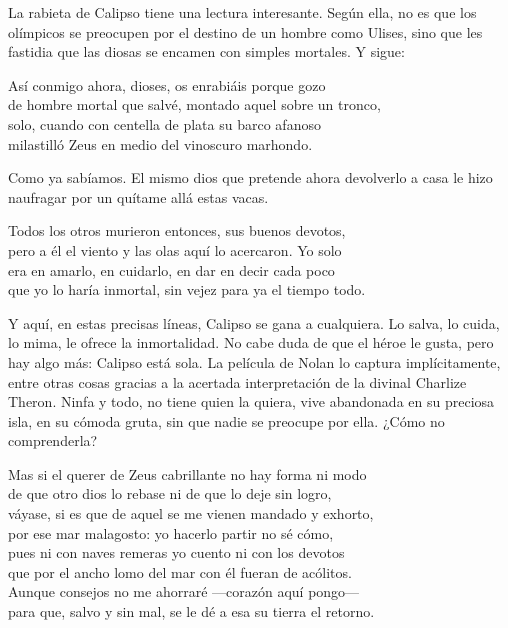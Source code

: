 La rabieta de Calipso tiene una lectura interesante. Según ella, no es que los olímpicos se preocupen por el destino de un hombre como Ulises, sino que les fastidia que las diosas se encamen con simples mortales. Y sigue:

\begin{versocita}
Así conmigo ahora, dioses, os enrabiáis porque gozo\\
de hombre mortal que salvé, montado aquel sobre un tronco,\\
solo, cuando con centella de plata su barco afanoso\\
milastilló Zeus en medio del vinoscuro marhondo.
\end{versocita}


Como ya sabíamos. El mismo dios que pretende ahora devolverlo a casa le hizo naufragar por un quítame allá estas vacas.

\begin{versocita}
Todos los otros murieron entonces, sus buenos devotos,\\
pero a él el viento y las olas aquí lo acercaron. Yo solo\\
era en amarlo, en cuidarlo, en dar en decir cada poco\\
que yo lo haría inmortal, sin vejez para ya el tiempo todo.
\end{versocita}

Y aquí, en estas precisas líneas, Calipso se gana a cualquiera. Lo salva, lo cuida, lo mima, le ofrece la inmortalidad. No cabe duda de que el héroe le gusta, pero hay algo más: Calipso está sola. La película de Nolan lo captura implícitamente, entre otras cosas gracias a la acertada interpretación de la divinal Charlize Theron. Ninfa y todo, no tiene quien la quiera, vive abandonada en su preciosa isla, en su cómoda gruta, sin que nadie se preocupe por ella. ¿Cómo no comprenderla?

\begin{versocita}
Mas si el querer de Zeus cabrillante no hay forma ni modo\\
de que otro dios lo rebase ni de que lo deje sin logro,\\
váyase, si es que de aquel se me vienen mandado y exhorto,\\
por ese mar malagosto: yo hacerlo partir no sé cómo,\\
pues ni con naves remeras yo cuento ni con los devotos\\
que por el ancho lomo del mar con él fueran de acólitos.\\
Aunque consejos no me ahorraré ---corazón aquí pongo---\\
para que, salvo y sin mal, se le dé a esa su tierra el retorno.
\end{versocita}

